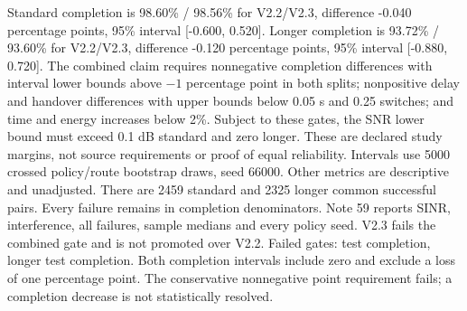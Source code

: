 Standard completion is 98.60\% / 98.56\% for V2.2/V2.3, difference -0.040 percentage points, 95\% interval [-0.600, 0.520].
Longer completion is 93.72\% / 93.60\% for V2.2/V2.3, difference -0.120 percentage points, 95\% interval [-0.880, 0.720].
The combined claim requires nonnegative completion differences with interval lower bounds above $-1$ percentage point in both splits; nonpositive delay and handover differences with upper bounds below 0.05 s and 0.25 switches; and time and energy increases below 2\%. Subject to these gates, the SNR lower bound must exceed 0.1 dB standard and zero longer. These are declared study margins, not source requirements or proof of equal reliability. Intervals use 5000 crossed policy/route bootstrap draws, seed 66000. Other metrics are descriptive and unadjusted.
There are 2459 standard and 2325 longer common successful pairs. Every failure remains in completion denominators. Note 59 reports SINR, interference, all failures, sample medians and every policy seed.
V2.3 fails the combined gate and is not promoted over V2.2. Failed gates: test completion, longer test completion. Both completion intervals include zero and exclude a loss of one percentage point. The conservative nonnegative point requirement fails; a completion decrease is not statistically resolved.
